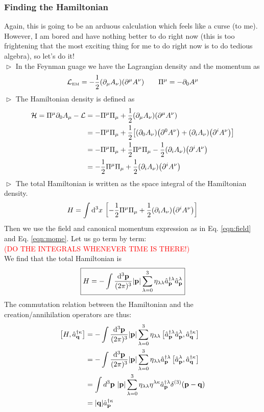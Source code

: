 \subsubsection{Finding the Hamiltonian}
Again, this is going to be an arduous calculation which feels like a curse (to me). However, I am bored and have nothing better to do right now (this is too frightening that the most exciting thing for me to do right now is to do tedious algebra), so let's do it!\\[0.2cm]
$\vartriangleright$ In the Feynman guage we have the Lagrangian density and the momentum as $$\mathcal L_{\text{\tiny EM}}  =-\frac{1}{2}(\partial_\mu A_\nu)(\partial^\mu A^\nu)\qquad \Pi^\mu = -\partial_0 A^\mu $$
$\vartriangleright$ The Hamiltonian density is defined as 
\begin{align*}
    \mathcal H =\Pi^\mu \partial_0 A_\mu - \mathcal L &= -\Pi^\mu\Pi_\mu +\frac{1}{2}\qty(\partial_\mu A_\nu)\qty(\partial^\mu A^\nu)\\
    &=-\Pi^\mu\Pi_\mu +\frac{1}{2}\qty[(\partial_0 A_\nu)\qty(\partial^0 A^\nu) + (\partial_i A_\nu)\qty(\partial^i A^\nu)]\\
    &=-\Pi^\mu\Pi_\mu  +\frac{1}{2}\Pi^\mu\Pi_\mu  -\frac{1}{2}(\partial_i A_\nu)\qty(\partial^i A^\nu)\\
    &=-\frac{1}{2}\Pi^\mu\Pi_\mu  +\frac{1}{2}(\partial_i A_\nu)\qty(\partial^i A^\nu)
\end{align*}
$\vartriangleright$ The total Hamiltonian is written as the space integral of the Hamiltonian density. 
\begin{align*}
    H = \int \dd^3 x \ \qty[-\frac{1}{2}\Pi^\mu\Pi_\mu  +\frac{1}{2}(\partial_i A_\nu)\qty(\partial^i A^\nu)]
\end{align*}
Then we use the field and canonical momentum expression as in Eq. \ref{eqn:field} and Eq. \ref{eqn:mome}. Let us go term by term:\\
\textcolor{red}{(DO THE INTEGRALS WHENEVER TIME IS THERE!)}\\
We find that the total Hamiltonian is
\begin{equation}\label{eqn:hampho}
    \boxed{H = -\int \frac{\dd^3\vb{{\vb{p}}}}{(2\pi)^3} |\vb{p}| \sum\limits_{\lambda=0}^3 \eta_{\lambda \lambda} \hat{a}_{\vb{p}}^{\dagger\lambda} \hat{a}_{\vb{p}}^{\lambda} }
\end{equation}
The commutation relation between the Hamiltonian and the creation/annihilation operators are thus:
\begin{align*}
    \left[ H, \hat{a}_{\vb{q}}^{\dagger\kappa}  \right] &=  -\int \frac{\dd^3\vb{{\vb{p}}}}{(2\pi)^3} |\vb{p}| \sum\limits_{\lambda=0}^3 \eta_{\lambda \lambda}\left[ \hat{a}_{\vb{p}}^{\dagger\lambda} \hat{a}_{\vb{p}}^{\lambda}, \hat{a}_{\vb{q}}^{\dagger\kappa}  \right]\\
    &=-\int \frac{\dd^3\vb{{\vb{p}}}}{(2\pi)^3} |\vb{p}| \sum\limits_{\lambda=0}^3 \eta_{\lambda \lambda}\hat{a}_{\vb{p}}^{\dagger\lambda}\left[  \hat{a}_{\vb{p}}^{\lambda}, \hat{a}_{\vb{q}}^{\dagger\kappa}  \right]\\
    &=\int d^3\vb{p}\ |\vb{p}| \sum\limits_{\lambda=0}^3 \eta_{\lambda \lambda} \eta^{\lambda \kappa} \hat{a}_{\vb{p}}^{\dagger\lambda}\delta^{(3)}(\vb{p} - \vb{q})\\
    &=|\vb{q}|\hat{a}_{\vb{p}}^{\dagger\kappa}
\end{align*}
